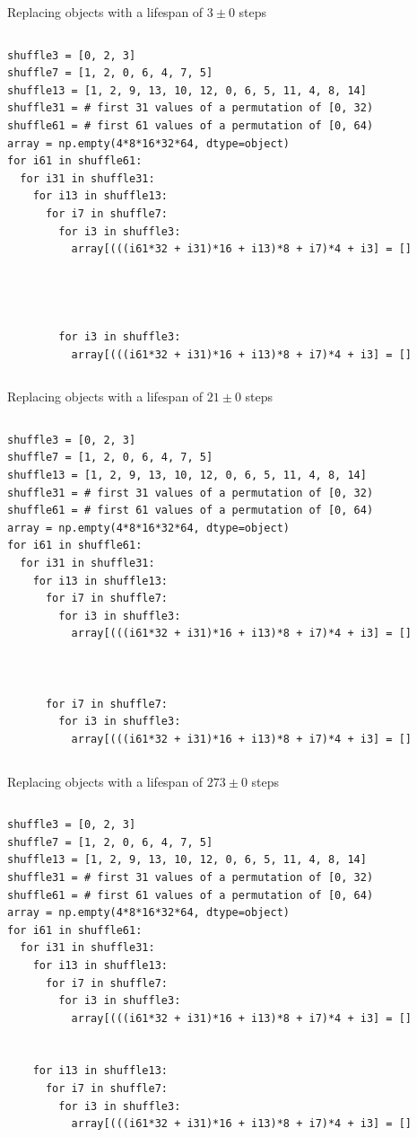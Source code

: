 \documentclass[aspectratio=169]{beamer}
\begin{document}
\begin{frame}[fragile]{Replacing objects with a lifespan of $3 \pm 0$ steps}
\small
\begin{columns}
\begin{verbatim}
shuffle3 = [0, 2, 3]
shuffle7 = [1, 2, 0, 6, 4, 7, 5]
shuffle13 = [1, 2, 9, 13, 10, 12, 0, 6, 5, 11, 4, 8, 14]
shuffle31 = # first 31 values of a permutation of [0, 32)
shuffle61 = # first 61 values of a permutation of [0, 64)
array = np.empty(4*8*16*32*64, dtype=object)
for i61 in shuffle61:
  for i31 in shuffle31:
    for i13 in shuffle13:
      for i7 in shuffle7:
        for i3 in shuffle3:
          array[(((i61*32 + i31)*16 + i13)*8 + i7)*4 + i3] = []




        for i3 in shuffle3:
          array[(((i61*32 + i31)*16 + i13)*8 + i7)*4 + i3] = []
\end{verbatim}
\end{columns}
\end{frame}

\begin{frame}[fragile]{Replacing objects with a lifespan of $21 \pm 0$ steps}
\small
\begin{columns}
\begin{verbatim}
shuffle3 = [0, 2, 3]
shuffle7 = [1, 2, 0, 6, 4, 7, 5]
shuffle13 = [1, 2, 9, 13, 10, 12, 0, 6, 5, 11, 4, 8, 14]
shuffle31 = # first 31 values of a permutation of [0, 32)
shuffle61 = # first 61 values of a permutation of [0, 64)
array = np.empty(4*8*16*32*64, dtype=object)
for i61 in shuffle61:
  for i31 in shuffle31:
    for i13 in shuffle13:
      for i7 in shuffle7:
        for i3 in shuffle3:
          array[(((i61*32 + i31)*16 + i13)*8 + i7)*4 + i3] = []



      for i7 in shuffle7:
        for i3 in shuffle3:
          array[(((i61*32 + i31)*16 + i13)*8 + i7)*4 + i3] = []
\end{verbatim}
\end{columns}
\end{frame}

\begin{frame}[fragile]{Replacing objects with a lifespan of $273 \pm 0$ steps}
\small
\begin{columns}
\begin{verbatim}
shuffle3 = [0, 2, 3]
shuffle7 = [1, 2, 0, 6, 4, 7, 5]
shuffle13 = [1, 2, 9, 13, 10, 12, 0, 6, 5, 11, 4, 8, 14]
shuffle31 = # first 31 values of a permutation of [0, 32)
shuffle61 = # first 61 values of a permutation of [0, 64)
array = np.empty(4*8*16*32*64, dtype=object)
for i61 in shuffle61:
  for i31 in shuffle31:
    for i13 in shuffle13:
      for i7 in shuffle7:
        for i3 in shuffle3:
          array[(((i61*32 + i31)*16 + i13)*8 + i7)*4 + i3] = []


    for i13 in shuffle13:
      for i7 in shuffle7:
        for i3 in shuffle3:
          array[(((i61*32 + i31)*16 + i13)*8 + i7)*4 + i3] = []
\end{verbatim}
\end{columns}
\end{frame}
\end{document}
